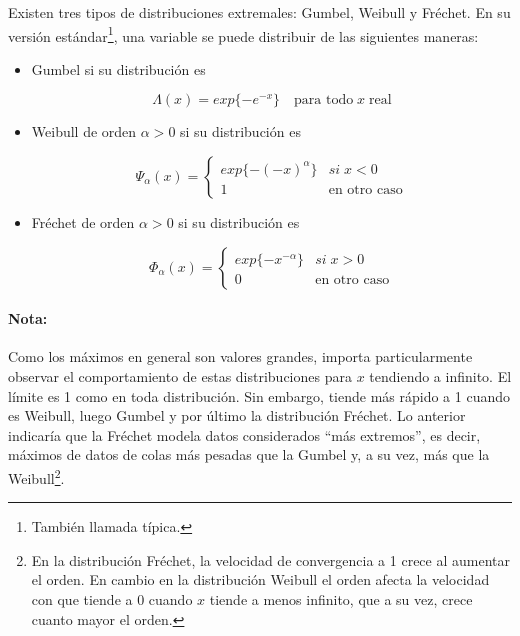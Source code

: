 \documentclass[
  12pt]{article}
\begin{document}
\begin{mydefinition}
 Existen tres tipos de distribuciones extremales: Gumbel, Weibull y Fréchet. En su versión estándar\footnote{También llamada típica.}, una variable se puede distribuir de las siguientes maneras:

\begin{itemize}
\item Gumbel si su distribución es 

\begin{equation}
\Lambda(x) = exp\{-e^{-x}\} \quad\text{para todo}\; x \;\text{real} 
\end{equation}

\item Weibull de orden $\alpha>0$ si su distribución es

\begin{equation}
\Psi_{\alpha}(x)=\begin{cases}
exp\{-(-x)^{\alpha}\} & si\;x<0\\
1 & \text{en otro caso}
\end{cases}
\end{equation}

\item Fréchet de orden $\alpha>0$ si su distribución es

\begin{equation}
\Phi_{\alpha}(x)=\begin{cases}
exp\{-x^{-\alpha}\} & si\;x>0\\
0 & \text{en otro caso}
\end{cases}
\end{equation}
\end{itemize}
\end{mydefinition}

\paragraph*{Nota:}

Como los máximos en general son valores grandes, importa particularmente
observar el comportamiento de estas distribuciones para \(x\) tendiendo
a infinito. El límite es 1 como en toda distribución. Sin embargo,
tiende más rápido a 1 cuando es Weibull, luego Gumbel y por último la
distribución Fréchet. Lo anterior indicaría que la Fréchet modela datos
considerados ``más extremos'', es decir, máximos de datos de colas más
pesadas que la Gumbel y, a su vez, más que la
Weibull\footnote{En la distribución Fréchet, la velocidad de convergencia a 1 crece al aumentar el orden. En cambio en la distribución Weibull el orden afecta la velocidad con que tiende a 0 cuando $x$ tiende a menos infinito, que a su vez, crece cuanto mayor el orden.}.
\end{document}
